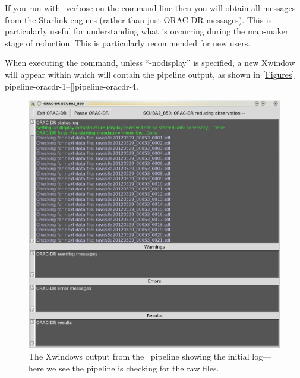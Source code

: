 \begin{tip}
  If you run with -verbose on the command line then you will obtain all messages
 from the Starlink engines (rather than just ORAC-DR messages). This is
 particularly useful for understanding what is occurring during the map-maker stage
 of reduction. This is particularly recommended for new users.
\end{tip}

When executing the \oracdr command, unless ``-nodisplay'' is specified,
a new Xwindow will appear within which
will contain the pipeline output, as shown in \cref{Figures}
{pipeline-oracdr-1}{}--\cref{}{pipeline-oracdr-4}{}.

\begin{figure}
\begin{center}
\includegraphics[width=0.7\linewidth]{sc21-pipeline-oracdr-1}
\caption[Output from the pipeline]{The Xwindows output from the \oracdr\
pipeline showing the initial log---here we see the pipeline is checking
for the raw files. \label{pipeline-oracdr-1}}
\end{center}
\end{figure}

